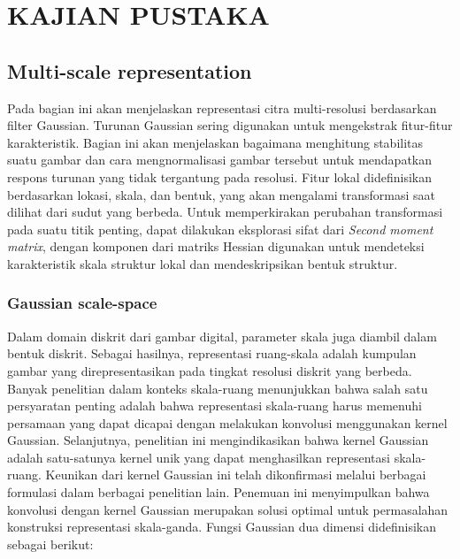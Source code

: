 
\chapter{KAJIAN PUSTAKA}

\section{\textbf{Multi-scale representation}}

Pada bagian ini akan menjelaskan representasi citra multi-resolusi berdasarkan filter Gaussian. 
Turunan Gaussian sering digunakan untuk mengekstrak fitur-fitur karakteristik. Bagian ini akan menjelaskan bagaimana menghitung stabilitas 
suatu gambar dan cara mengnormalisasi gambar tersebut untuk mendapatkan respons turunan yang tidak tergantung pada resolusi. 
Fitur lokal didefinisikan berdasarkan lokasi, skala, dan bentuk, yang akan mengalami transformasi saat dilihat dari sudut yang berbeda. 
Untuk memperkirakan perubahan transformasi pada suatu titik penting, dapat dilakukan eksplorasi sifat dari \emph{Second moment matrix}, 
dengan komponen dari matriks Hessian digunakan untuk mendeteksi karakteristik skala struktur lokal dan mendeskripsikan bentuk struktur.

\subsection{\textbf{Gaussian scale-space}}

Dalam domain diskrit dari gambar digital, parameter skala juga diambil dalam bentuk diskrit. 
Sebagai hasilnya, representasi ruang-skala adalah kumpulan gambar yang direpresentasikan pada tingkat resolusi diskrit yang berbeda. 
Banyak penelitian dalam konteks skala-ruang menunjukkan bahwa salah satu persyaratan penting adalah bahwa representasi skala-ruang harus memenuhi persamaan yang dapat dicapai dengan melakukan konvolusi menggunakan kernel Gaussian. 
Selanjutnya, penelitian ini mengindikasikan bahwa kernel Gaussian adalah satu-satunya kernel unik yang dapat menghasilkan representasi skala-ruang. 
Keunikan dari kernel Gaussian ini telah dikonfirmasi melalui berbagai formulasi dalam berbagai penelitian lain. 
Penemuan ini menyimpulkan bahwa konvolusi dengan kernel Gaussian merupakan solusi optimal untuk permasalahan konstruksi representasi skala-ganda. 
Fungsi Gaussian dua dimensi didefinisikan sebagai berikut:

